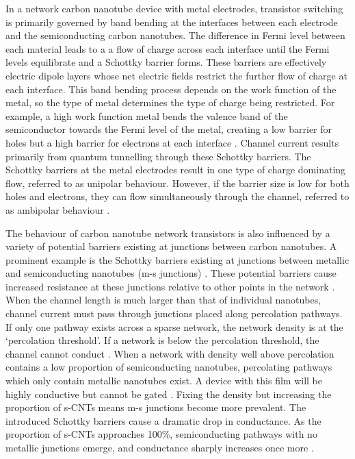 \documentclass[
  a4paper,
]{scrbook}
\begin{document}
In a network carbon nanotube device with metal electrodes, transistor
switching is primarily governed by band bending at the interfaces
between each electrode and the semiconducting carbon nanotubes. The
difference in Fermi level between each material leads to a a flow of
charge across each interface until the Fermi levels equilibrate and a
Schottky barrier forms. These barriers are effectively electric dipole
layers whose net electric fields restrict the further flow of charge at
each interface. This band bending process depends on the work function
of the metal, so the type of metal determines the type of charge being
restricted. For example, a high work function metal bends the valence
band of the semiconductor towards the Fermi level of the metal, creating
a low barrier for holes but a high barrier for electrons at each
interface \autocite{Avouris2007,Bargaoui2018}. Channel current results
primarily from quantum tunnelling through these Schottky barriers. The
Schottky barriers at the metal electrodes result in one type of charge
dominating flow, referred to as unipolar behaviour. However, if the
barrier size is low for both holes and electrons, they can flow
simultaneously through the channel, referred to as ambipolar behaviour
\autocite{Avouris2007,Heller2008}.

The behaviour of carbon nanotube network transistors is also influenced
by a variety of potential barriers existing at junctions between carbon
nanotubes. A prominent example is the Schottky barriers existing at
junctions between metallic and semiconducting nanotubes (m-s junctions)
\autocite{Fuhrer2000,Topinka2009,Murugathas2019a}. These potential
barriers cause increased resistance at these junctions relative to other
points in the network \autocite{Fuhrer2000,Jang2015}. When the channel
length is much larger than that of individual nanotubes, channel current
must pass through junctions placed along percolation pathways. If only
one pathway exists across a sparse network, the network density is at
the `percolation threshold'. If a network is below the percolation
threshold, the channel cannot conduct
\autocite{Hu2004,Topinka2009,Jang2015}. When a network with density well
above percolation contains a low proportion of semiconducting nanotubes,
percolating pathways which only contain metallic nanotubes exist. A
device with this film will be highly conductive but cannot be gated
\autocite{Fuhrer2000,Topinka2009}. Fixing the density but increasing the
proportion of s-CNTs means m-s junctions become more prevalent. The
introduced Schottky barriers cause a dramatic drop in conductance. As
the proportion of s-CNTs approaches 100\%, semiconducting pathways with
no metallic junctions emerge, and conductance sharply increases once
more \autocite{Topinka2009}.
\end{document}
